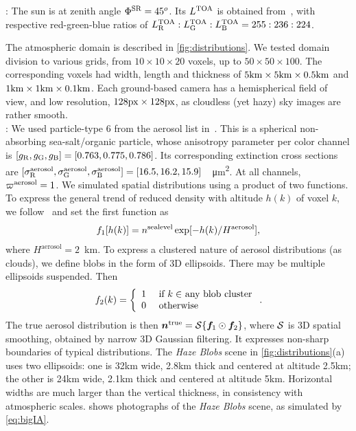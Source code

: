 \documentclass[10pt,letterpaper]{article}
\begin{document}
: The sun is at zenith angle $\Phi^{\rm
  SR}=45^o$.  Its $L^{\rm TOA}$ is obtained
from~\cite{BBradiance,sun_composition}, with respective red-green-blue
ratios of $L^{\rm TOA}_{\rm R}:L^{\rm TOA}_{\rm G}:L^{\rm TOA}_{\rm
  B}=255:236:224$.

The atmospheric domain is described in \cref{fig:distributions}.
We tested domain division to various grids, from $10\times10 \times
20$ voxels, up to $50\times50 \times 100$. The corresponding voxels
had width, length and thickness of $5{\rm km}\times 5{\rm km} \times
0.5{\rm km}$ and $1{\rm km}\times 1{\rm km} \times 0.1{\rm km}$.  Each
ground-based camera has a hemispherical field of view, and low
resolution, $128 \rm{px} \times 128 \rm{px}$, as cloudless (yet hazy)
sky images are rather smooth.
\\

: We used particle-type 6 from the aerosol list
in~\cite{Martonchik2009}. This is a spherical non-absorbing
sea-salt/organic particle, whose anisotropy parameter per color
channel is $[g_{\rm R},g_{\rm G},g_{\rm B}]=[0.763,0.775,0.786]$. Its
corresponding extinction cross sections are $[\sigma^{\rm
  aerosol}_{\rm R}, \sigma^{\rm aerosol}_{\rm G}, \sigma^{\rm
  aerosol}_{\rm
  B}]=[16.5,16.2,15.9]$~\si[sticky-per]{\per\micro\meter\squared}.  At
all channels, $\varpi^{\rm aerosol}=1$. We simulated spatial
distributions using a product of two functions. To express the general
trend of reduced density with altitude $h(k)$ of voxel $k$, we
follow~\cite{Levi1980} and set the first function as
\begin{align}
  f_1[h(k)] = n^{\rm sealevel}
  \exp[-h(k)/H^\mathrm{aerosol}],
\end{align}
where $H^\mathrm{aerosol}=2$~\si{\km}. To express a clustered nature
of aerosol distributions (as clouds), we define blobs in the form of
3D ellipsoids. There may be multiple ellipsoids suspended.  Then
\begin{equation}
  f_2(k) =
  \left\{
    \begin{array}{ll}
      1  & \mbox{ if $k\in$ any blob cluster} \\
      0  & \mbox{ otherwise}
      \label{eq:f2}
    \end{array}
  \right.
  .
  \hspace{-0.05cm}
\end{equation}
The true aerosol distribution is then ${\bm n}^{\rm true}={\cal
  S}\{{\bm f}_1\odot {\bm f}_2\}$, where ${\cal S}$ is 3D spatial
smoothing, obtained by narrow 3D Gaussian filtering. It expresses
non-sharp boundaries of typical distributions. The {\em Haze Blobs}
scene in \cref{fig:distributions}(a) uses two ellipsoids: one is 32km
wide, 2.8km thick and centered at altitude 2.5km; the other is 24km
wide, 2.1km thick and centered at altitude 5km. Horizontal widths
are much larger than the vertical thickness, in consistency with
atmospheric scales.  shows
photographs of the {\em Haze Blobs} scene, as simulated by
\cref{eq:bigIA}.
\end{document}
